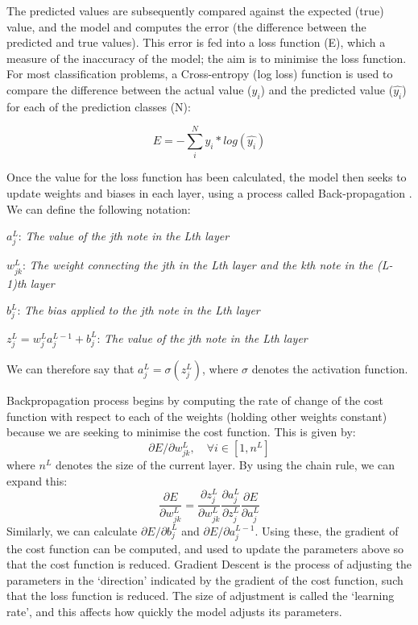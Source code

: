 The predicted values are subsequently compared against the expected (true) value, and the model and computes the error (the difference between the predicted and true values). This error is fed into a loss function (E), which a measure of the inaccuracy of the model; the aim is to minimise the loss function. For most classification problems, a Cross-entropy (log loss) function is used to compare the difference between the actual value ($y_i$) and the predicted value ($\hat{y_i}$) for each of the prediction classes (N):

$$E = -\sum_i^N y_i*log(\hat{y_i})$$

Once the value for the loss function has been calculated, the model then seeks to update weights and biases in each layer, using a process called Back-propagation \citep{Rumelhart}. We can define the following notation:

$a_j^L$: \textit{The value of the jth note in the Lth layer}

$w_{jk}^L$: \textit{The weight connecting the jth in the Lth layer and the kth note in the (L-1)th layer}

$b_j^L$: \textit{The bias applied to the jth note in the Lth layer}

$z_j^L = w_j^L a_j^{L-1} + b_j^L$: \textit{The value of the jth note in the Lth layer}

We can therefore say that $a_j^L = \sigma(z_j^L)$, where $\sigma$ denotes the activation function.

Backpropagation process begins by computing the rate of change of the cost function with respect to each of the weights (holding other weights constant) because we are seeking to minimise the cost function. This is given by:
$$\partial E/ \partial w_{jk}^L,\quad \forall  i \in [1,n^L]$$ where $n^L$ denotes the size of the current layer. By using the chain rule, we can expand this:
$$\frac{\partial E}{\partial w_{jk}^L} = \frac{\partial z_j^L}{\partial w_{jk}^L} \frac{\partial a_j^L}{\partial z_j^L} \frac{\partial E}{\partial a_j^L}$$ %
Similarly, we can calculate $\partial E/ \partial b_j^L$ and $\partial E/ \partial a_j^{L-1}$. Using these, the gradient of the cost function can be computed, and used to update the parameters above so that the cost function is reduced. Gradient Descent is the process of adjusting the parameters in the `direction' indicated by the gradient of the cost function, such that the loss function is reduced. The size of adjustment is called the `learning rate', and this affects how quickly the model adjusts its parameters.

